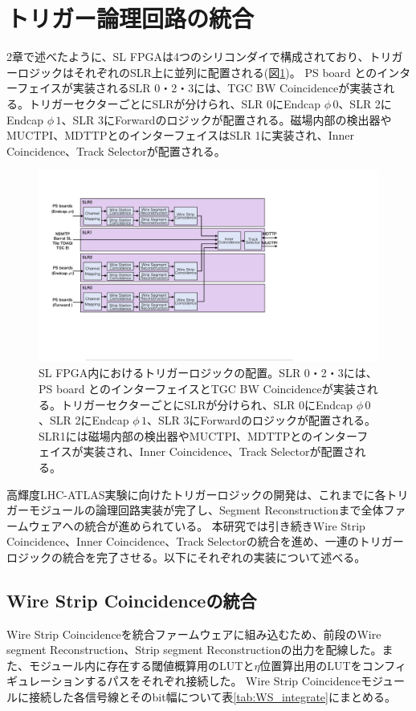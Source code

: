 \section{トリガー論理回路の統合}
\label{sec_TriggerIntegration}
2章で述べたように、SL FPGAは4つのシリコンダイで構成されており、トリガーロジックはそれぞれのSLR上に並列に配置される(図\ref{Trigger_floor})。
PS board とのインターフェイスが実装されるSLR 0・2・3には、TGC BW Coincidenceが実装される。トリガーセクターごとにSLRが分けられ、SLR 0にEndcap $\phi\,0$、SLR 2にEndcap $\phi\,1$、SLR 3にForwardのロジックが配置される。磁場内部の検出器やMUCTPI、MDTTPとのインターフェイスはSLR 1に実装され、Inner Coincidence、Track Selectorが配置される。

\begin{figure} 
\centering
\includegraphics[width=16cm]{fig/SL/Trigger_floor.pdf}
\caption[SL FPGA内におけるトリガーロジックの配置]{SL FPGA内におけるトリガーロジックの配置。SLR 0・2・3には、PS board とのインターフェイスとTGC BW Coincidenceが実装される。トリガーセクターごとにSLRが分けられ、SLR 0にEndcap $\phi\,0$、SLR 2にEndcap $\phi\,1$、SLR 3にForwardのロジックが配置される。SLR1には磁場内部の検出器やMUCTPI、MDTTPとのインターフェイスが実装され、Inner Coincidence、Track Selectorが配置される。}
\label{Trigger_floor}
\end{figure}

高輝度LHC-ATLAS実験に向けたトリガーロジックの開発は、これまでに各トリガーモジュールの論理回路実装が完了し、Segment Reconstructionまで全体ファームウェアへの統合が進められている。
本研究では引き続きWire Strip Coincidence、Inner Coincidence、Track Selectorの統合を進め、一連のトリガーロジックの統合を完了させる。以下にそれぞれの実装について述べる。

\subsection{Wire Strip Coincidenceの統合}
Wire Strip Coincidenceを統合ファームウェアに組み込むため、前段のWire segment Reconstruction、Strip segment Reconstructionの出力を配線した。また、モジュール内に存在する\pt  閾値概算用のLUTと$\eta$位置算出用のLUTをコンフィギュレーションするパスをそれぞれ接続した。
Wire Strip Coincidenceモジュールに接続した各信号線とそのbit幅について表\ref{tab:WS_integrate}にまとめる。

